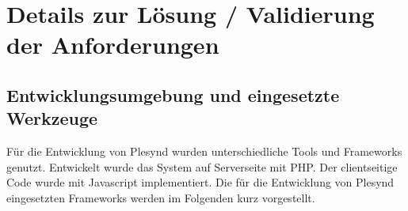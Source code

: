 \chapter{Details zur Lösung / Validierung der Anforderungen}\label{chapter:Kapitel6}

\section{Entwicklungsumgebung und eingesetzte Werkzeuge}\label{section:entwicklungsumgebungen_tools}
Für die Entwicklung von Plesynd wurden unterschiedliche Tools und Frameworks genutzt. Entwickelt wurde das System auf Serverseite mit PHP. Der clientseitige Code wurde mit Javascript implementiert. Die für die Entwicklung von Plesynd eingesetzten Frameworks werden im Folgenden kurz vorgestellt.

